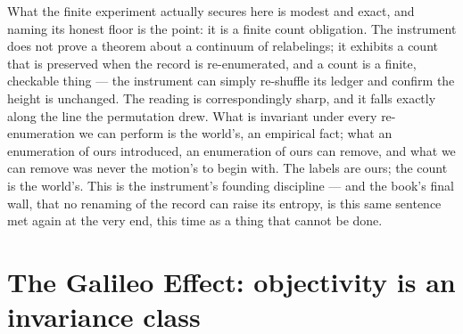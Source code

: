 What the finite experiment actually secures here is modest and exact, and naming its honest floor is the
point: it is a finite count obligation. The instrument does not prove a theorem about a continuum of
relabelings; it exhibits a count that is preserved when the record is re-enumerated, and a count is a finite,
checkable thing --- the instrument can simply re-shuffle its ledger and confirm the height is unchanged. The
reading is correspondingly sharp, and it falls exactly along the line the permutation drew. What is invariant
under every re-enumeration we can perform is the world's, an empirical fact; what an enumeration of ours
introduced, an enumeration of ours can remove, and what we can remove was never the motion's to begin with.
The labels are ours; the count is the world's. This is the instrument's founding discipline --- and the
book's final wall, that no renaming of the record can raise its entropy, is this same sentence met again at
the very end, this time as a thing that cannot be done.

\section{The Galileo Effect: objectivity is an invariance class}
\label{se:galileo}


